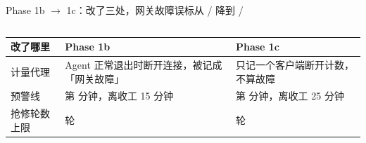 \documentclass[aspectratio=169,10pt,t]{ctexbeamer}
\begin{document}
\begin{frame}{Phase 1b $\to$ 1c：改了三处，网关故障误标从 / 降到 /}
  \begin{columns}[T,totalwidth=\textwidth]
    \begin{column}{84mm}
      {\scriptsize\renewcommand{\arraystretch}{1.28}%
      \begin{tabular}{@{}L{22mm}L{27.5mm}L{28.5mm}@{}}
        \toprule
        \textbf{改了哪里} & \textbf{Phase 1b} & \textbf{Phase 1c} \\ \midrule
        计量代理  & Agent 正常退出时断开连接，被记成「网关故障」
          & 只记一个客户端断开计数，不算故障 \\
        预警线 & 第  分钟，离收工 15 分钟 & 第  分钟，离收工 25 分钟 \\
        抢修轮数上限 &  轮 &  轮 \\
        \bottomrule
      \end{tabular}}
      \vspace{1.6mm}


\end{column}
\end{columns}
\end{frame}
\end{document}
